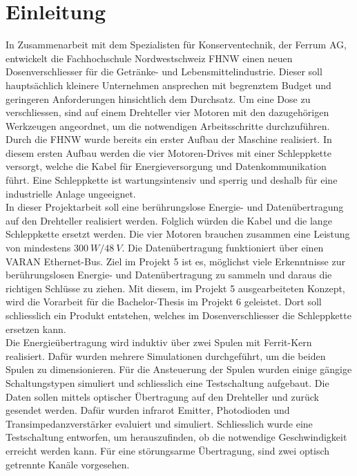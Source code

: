\section{Einleitung}
In Zusammenarbeit mit dem Spezialisten für Konserventechnik, der Ferrum AG, entwickelt die Fachhochschule Nordwestschweiz FHNW einen neuen Dosenverschliesser für die Getränke- und Lebensmittelindustrie. Dieser soll hauptsächlich kleinere Unternehmen ansprechen mit begrenztem Budget und geringeren Anforderungen hinsichtlich dem Durchsatz. Um eine Dose zu verschliessen, sind auf einem Drehteller vier Motoren mit den dazugehörigen Werkzeugen angeordnet, um die notwendigen Arbeitsschritte durchzuführen. Durch die FHNW wurde bereits ein erster Aufbau der Maschine realisiert. In diesem ersten Aufbau werden die vier Motoren-Drives mit einer Schleppkette versorgt, welche die Kabel für Energieversorgung und Datenkommunikation führt. Eine Schleppkette ist wartungsintensiv und sperrig und deshalb für eine industrielle Anlage ungeeignet.
\newline
\ \\
In dieser Projektarbeit soll eine berührungslose Energie- und Datenübertragung auf den Drehteller realisiert werden. Folglich würden die Kabel und die lange Schleppkette ersetzt werden. Die vier Motoren brauchen zusammen eine Leistung von mindestens $\SI{300}{W}/\SI{48}{V}$. Die Datenübertragung funktioniert über einen VARAN Ethernet-Bus. Ziel im Projekt 5 ist es, möglichst viele Erkenntnisse zur berührungslosen Energie- und Datenübertragung zu sammeln und daraus die richtigen Schlüsse zu ziehen. Mit diesem, im Projekt 5 ausgearbeiteten Konzept, wird die Vorarbeit für die Bachelor-Thesis im Projekt 6 geleistet. Dort soll schliesslich ein Produkt entstehen, welches im Dosenverschliesser die Schleppkette ersetzen kann.
\newline
\ \\
Die Energieübertragung wird induktiv über zwei Spulen mit Ferrit-Kern realisiert. Dafür wurden mehrere Simulationen durchgeführt, um die beiden Spulen zu dimensionieren. Für die Ansteuerung der Spulen wurden einige gängige Schaltungstypen simuliert und schliesslich eine Testschaltung aufgebaut. Die Daten sollen mittels optischer Übertragung auf den Drehteller und zurück gesendet werden. Dafür wurden infrarot Emitter, Photodioden und Transimpedanzverstärker evaluiert und simuliert. Schliesslich wurde eine Testschaltung entworfen, um herauszufinden, ob die notwendige Geschwindigkeit erreicht werden kann. Für eine störungsarme Übertragung, sind zwei optisch getrennte Kanäle vorgesehen.
